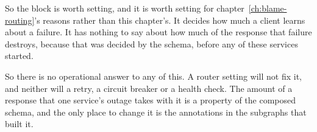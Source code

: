 %
So the block is worth setting, and it is worth setting for
chapter~\ref{ch:blame-routing}'s reasons rather than this chapter's. It decides
how much a client learns about a failure. It has nothing to say about how much
of the response that failure destroys, because that was decided by the schema,
before any of these services started.

%
So there is no operational answer to any of this. A router setting will not fix
it, and neither will a retry, a circuit breaker or a health check. The amount
of a response that one service's outage takes with it is a property of the
composed schema, and the only place to change it is the annotations in the
subgraphs that built it.
%
